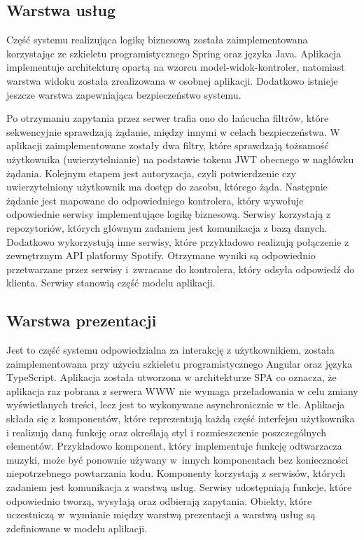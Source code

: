 \subsection{Warstwa usług}
Część systemu realizująca logikę biznesową została zaimplementowana korzystając ze szkieletu programistycznego Spring oraz języka Java. Aplikacja implementuje architekturę opartą na wzorcu model-widok-kontroler, natomiast warstwa widoku została zrealizowana w osobnej aplikacji. Dodatkowo istnieje jeszcze warstwa zapewniająca bezpieczeństwo systemu.

Po otrzymaniu zapytania przez serwer trafia ono do łańcucha filtrów, które sekwencyjnie sprawdzają żądanie, między innymi w celach bezpieczeństwa. W aplikacji zaimplementowane zostały dwa filtry, które sprawdzają tożsamość użytkownika (uwierzytelnianie) na podstawie tokenu JWT obecnego w nagłówku żądania. Kolejnym etapem jest autoryzacja, czyli potwierdzenie czy uwierzytelniony użytkownik ma dostęp do zasobu, którego żąda. Następnie żądanie jest mapowane do odpowiedniego kontrolera, który wywołuje odpowiednie serwisy implementujące logikę biznesową. Serwisy korzystają z repozytoriów, których głównym zadaniem jest komunikacja z bazą danych. Dodatkowo wykorzystują inne serwisy, które przykładowo realizują połączenie z zewnętrznym API platformy Spotify. Otrzymane wyniki są odpowiednio przetwarzane przez serwisy i~zwracane do kontrolera, który odsyła odpowiedź do klienta. Serwisy stanowią część modelu aplikacji.

\subsection{Warstwa prezentacji}
Jest to część systemu odpowiedzialna za interakcję z użytkownikiem, została zaimplementowana przy użyciu szkieletu programistycznego Angular oraz języka TypeScript. Aplikacja została utworzona w architekturze SPA co oznacza, że aplikacja raz pobrana z serwera WWW nie wymaga przeładowania w celu zmiany wyświetlanych treści, lecz jest to wykonywane asynchronicznie w tle. Aplikacja składa się z komponentów, które reprezentują każdą część interfejsu użytkownika i realizują daną funkcję oraz określają styl i rozmieszczenie poszczególnych elementów. Przykładowo komponent, który implementuje funkcję odtwarzacza muzyki, może być ponownie używany w~innych komponentach bez konieczności niepotrzebnego powtarzania kodu. Komponenty korzystają z serwisów, których zadaniem jest komunikacja z warstwą usług. Serwisy udostępniają funkcje, które odpowiednio tworzą, wysyłają oraz odbierają zapytania. Obiekty, które uczestniczą w~wymianie między warstwą prezentacji a warstwą usług są zdefiniowane w modelu aplikacji.


